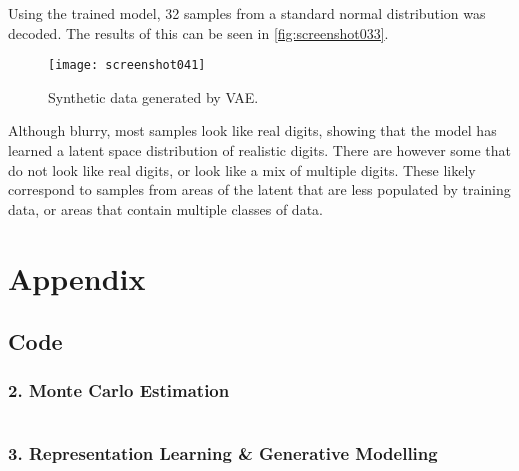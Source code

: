 \documentclass[a4paper, 12pt]{article}
\begin{document}
Using the trained model, 32 samples from a standard normal distribution was decoded. The results of this can be seen in \autoref{fig:screenshot033}.

\begin{figure}[H]
	\centering
	\texttt{[image: screenshot041]}
	\caption{Synthetic data generated by VAE.}
	\label{fig:screenshot033}
\end{figure}

Although blurry, most samples look like real digits, showing that the model has learned a latent space distribution of realistic digits. There are however some that do not look like real digits, or look like a mix of multiple digits. These likely correspond to samples from areas of the latent that are less populated by training data, or areas that contain multiple classes of data.

\appendix

\section{Appendix}

\subsection{Code}

\subsubsection{2. Monte Carlo Estimation}

\inputminted{python}{/home/runeebl/Documents/Datalogi/EML/exercise4/src/sampling.py}

\subsubsection{3. Representation Learning \& Generative Modelling}

\inputminted{python}{/home/runeebl/Documents/Datalogi/EML/exercise4/src/HA4_template.py}
\end{document}
